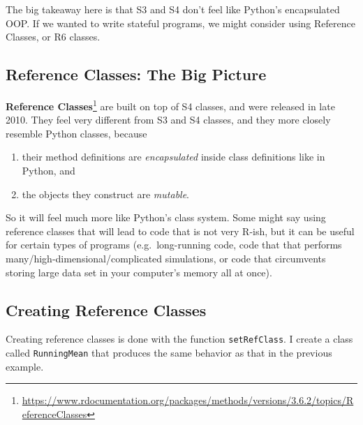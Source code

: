 \documentclass[
  12pt,
  krantz2]{krantz}
\providecommand{\tightlist}{%
  \setlength{\itemsep}{0pt}\setlength{\parskip}{0pt}}
\renewcommand{\href}[2]{#2\footnote{\url{#1}}}
\begin{document}
The big takeaway here is that S3 and S4 don't feel like Python's encapsulated OOP. If we wanted to write stateful programs, we might consider using Reference Classes, or R6 classes.

\hypertarget{reference-classes-the-big-picture}{%
\subsection{Reference Classes: The Big Picture}\label{reference-classes-the-big-picture}}

\href{https://www.rdocumentation.org/packages/methods/versions/3.6.2/topics/ReferenceClasses}{\textbf{Reference Classes}} are built on top of S4 classes, and were released in late 2010. They feel very different from S3 and S4 classes, and they more closely resemble Python classes, because

\begin{enumerate}
\def\labelenumi{\arabic{enumi}.}
\tightlist
\item
  their method definitions are \emph{encapsulated} inside class definitions like in Python, and
\item
  the objects they construct are \emph{mutable}.
\end{enumerate}

So it will feel much more like Python's class system. Some might say using reference classes that will lead to code that is not very R-ish, but it can be useful for certain types of programs (e.g.~long-running code, code that that performs many/high-dimensional/complicated simulations, or code that circumvents storing large data set in your computer's memory all at once).

\hypertarget{creating-reference-classes}{%
\subsection{Creating Reference Classes}\label{creating-reference-classes}}

Creating reference classes is done with the function \texttt{setRefClass}. I create a class called \texttt{RunningMean} that produces the same behavior as that in the previous example.
\end{document}
